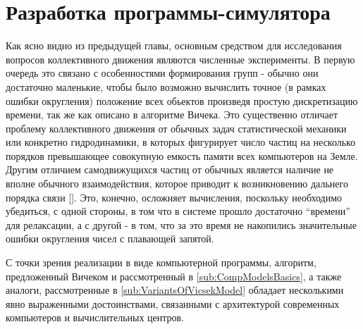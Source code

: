 \section{Разработка программы-симулятора} %
\label{sec:MotivationForProgramm}
    Как ясно видно из предыдущей главы, основным средством для исследования вопросов коллективного движения являются численные эксперименты. В первую очередь это связано с особенностями формирования групп - обычно они достаточно маленькие, чтобы было возможно вычислить точное (в рамках ошибки округления) положение всех обьектов произведя простую дискретизацию времени, так же как описано в алгоритме Вичека. Это существенно отличает проблему коллективного движения от обычных задач статистической механики или конкретно гидродинамики, в которых фигурирует число частиц на несколько порядков превышающее совокупную емкость памяти всех компьютеров на Земле. Другим отличием самодвижущихся частиц от обычных является наличие не вполне обычного взаимодействия, которое приводит к возникновению дальнего порядка связи []. Это, конечно, осложняет вычисления, поскольку необходимо убедиться, с одной стороны, в том что в системе прошло достаточно ``времени'' для релаксации, а с другой - в том, что за это время не накопились значительные ошибки округления чисел с плавающей запятой. 

    С точки зрения реализации в виде компьютерной программы, алгоритм, предложенный Вичеком и рассмотренный в \ref{sub:CompModelsBasics}, а также аналоги, рассмотренные в \ref{sub:VariantsOfVicsekModel} обладает несколькими явно выраженными достоинствами, связанными с архитектурой современных компьютеров и вычислительных центров.
